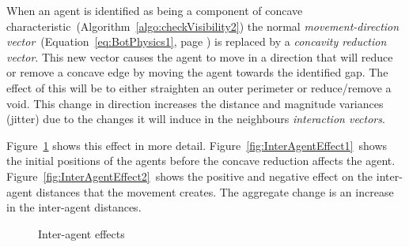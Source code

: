 When an agent is identified as being a component of concave characteristic~(Algorithm~\ref{algo:checkVisibility2}) the normal \textit{movement-direction vector}~(Equation~\ref{eq:BotPhysics1}, page \pageref{eq:BotPhysics1}) is replaced by a \textit{concavity reduction vector}. This new vector causes the agent to move in a direction that will reduce or remove a concave edge by moving the agent towards the identified gap. The effect of this will be to either straighten an outer perimeter or reduce/remove a void. This change in direction increases the distance and magnitude variances (jitter) due to the changes it will induce in the neighbours \textit{interaction vectors}.

Figure~\ref{fig:InterAgentEffects} shows this effect in more detail. Figure~\ref{fig:InterAgentEffect1}~shows the initial positions of the agents before the concave reduction affects the agent. Figure~\ref{fig:InterAgentEffect2}~shows the positive and negative effect on the inter-agent distances that the movement creates. The aggregate change is an increase in the inter-agent distances.

\begin{figure}[H]
\centering
{}
\caption{Inter-agent effects}
\label{fig:InterAgentEffects}
\end{figure}

